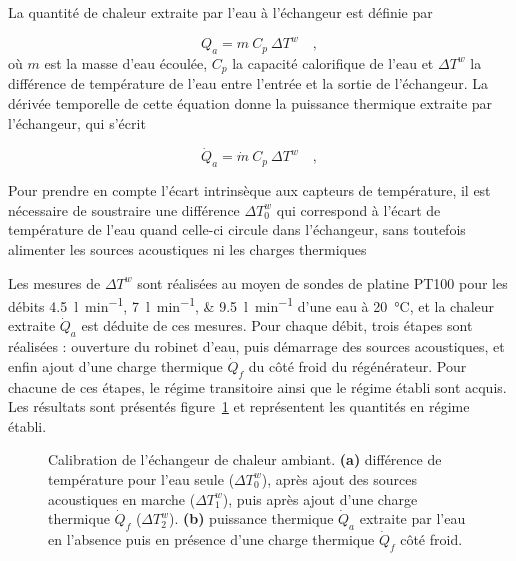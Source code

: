 La quantité de chaleur extraite par l'eau à l'échangeur est définie par

\begin{equation}
    Q_a = m\ C_p\ \Delta T^w\quad,
    \label{eq:Qa_energie}
\end{equation}
où $m$ est la masse d'eau écoulée, $C_p$ la capacité calorifique de l'eau et $\Delta T^w$ la différence de température de l'eau entre l'entrée et la sortie de l'échangeur. La dérivée temporelle de cette équation donne la puissance thermique extraite par l'échangeur, qui s'écrit

\begin{equation}
    \dot Q_a = \dot m\ C_p\ \Delta T^w\quad,
    \label{eq:Qa_puissance}
\end{equation}

Pour prendre en compte l'écart intrinsèque aux capteurs de température, il est nécessaire de soustraire une différence $\Delta T_0^w$ qui correspond à l'écart de température de l'eau quand celle-ci circule dans l'échangeur, sans toutefois alimenter les sources acoustiques ni les charges thermiques\medskip

Les mesures de $\Delta T^w$ sont réalisées au moyen de sondes de platine PT100 pour les débits \qtylist{4.5;7;9.5}{\litre\per\minute} d'une eau à \qty{20}{\degreeCelsius}, et la chaleur extraite $\dot Q_a$ est déduite de ces mesures. Pour chaque débit, trois étapes sont réalisées : ouverture du robinet d'eau, puis démarrage des sources acoustiques, et enfin ajout d'une charge thermique $\dot Q_f$ du côté froid du régénérateur. Pour chacune de ces étapes, le régime transitoire ainsi que le régime établi sont acquis. Les résultats sont présentés figure~\ref{fig:AHXCalib} et représentent les quantités en régime établi. 

\begin{figure}[!ht]
    \centering
    
    \caption[Calibration de l'échangeur de chaleur ambiant.]{Calibration de l'échangeur de chaleur ambiant. \textbf{(a)} différence de température pour l'eau seule ($\Delta T_0^w$), après ajout des sources acoustiques en marche ($\Delta T_1^w$), puis après ajout d'une charge thermique $\dot Q_f$ ($\Delta T_2^w$). \textbf{(b)} puissance thermique $\dot Q_a$ extraite par l'eau en l'absence puis en présence d'une charge thermique $\dot Q_f$ côté froid.}
    \label{fig:AHXCalib}
\end{figure}




